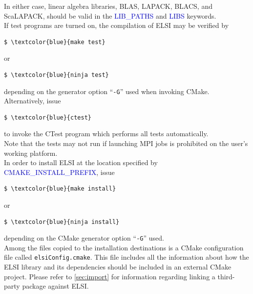 \documentclass{report}
\begin{document}
In either case, linear algebra libraries, BLAS, LAPACK, BLACS, and ScaLAPACK, should be valid in the \textcolor{blue}{LIB\_PATHS} and \textcolor{blue}{LIBS} keywords.\\

If test programs are turned on, the compilation of ELSI may be verified by
\begin{Verbatim}[commandchars=\\\{\}]
$ \textcolor{blue}{make test}
\end{Verbatim}

or
\begin{Verbatim}[commandchars=\\\{\}]
$ \textcolor{blue}{ninja test}
\end{Verbatim}

depending on the generator option ``\verb+-G+'' used when invoking CMake.  Alternatively, issue
\begin{Verbatim}[commandchars=\\\{\}]
$ \textcolor{blue}{ctest}
\end{Verbatim}

to invoke the CTest program which performs all tests automatically.\\

Note that the tests may not run if launching MPI jobs is prohibited on the user's working platform.\\

In order to install ELSI at the location specified by \textcolor{blue}{CMAKE\_INSTALL\_PREFIX}, issue
\begin{Verbatim}[commandchars=\\\{\}]
$ \textcolor{blue}{make install}
\end{Verbatim}

or
\begin{Verbatim}[commandchars=\\\{\}]
$ \textcolor{blue}{ninja install}
\end{Verbatim}

depending on the CMake generator option ``\verb+-G+'' used.\\

Among the files copied to the installation destinations is a CMake configuration file called \texttt{elsiConfig.cmake}.  This file includes all the information about how the ELSI library and its dependencies should be included in an external CMake project.  Please refer to \ref{sec:import} for information regarding linking a third-party package against ELSI.\\
\end{document}
